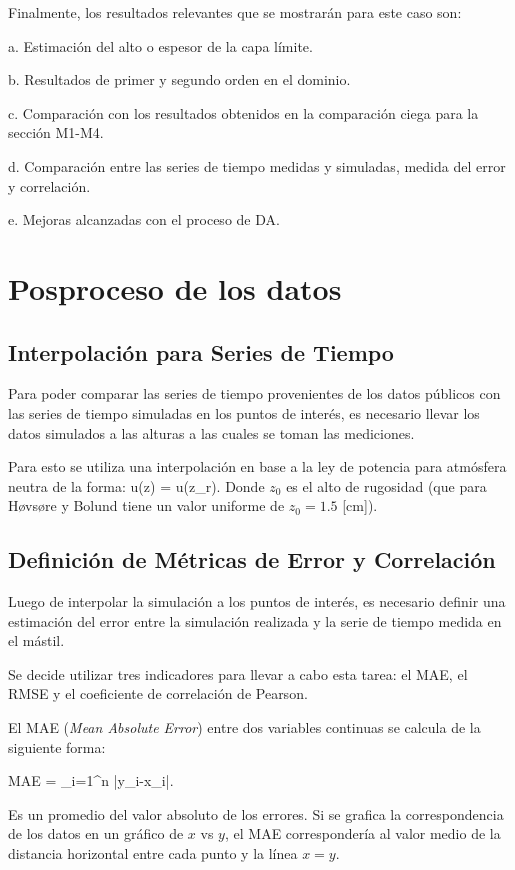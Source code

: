 Finalmente, los resultados relevantes que se mostrarán para este caso son:
\begin{enumerate*}
	\item[a.] Estimación del alto o espesor de la capa límite.
	\item[b.] Resultados de primer y segundo orden en el dominio.
	\item[c.] Comparación con los resultados obtenidos en la comparación ciega para la sección M1-M4.
	\item[d.] Comparación entre las series de tiempo medidas y simuladas, medida del error y correlación.
	\item[e.] Mejoras alcanzadas con el proceso de DA. 
\end{enumerate*}
\newpage
\section{Posproceso de los datos}
\subsection{Interpolación para Series de Tiempo}
Para poder comparar las series de tiempo provenientes de los datos públicos con las series de tiempo simuladas en los puntos de interés, es necesario llevar los datos simulados a las alturas a las cuales se toman las mediciones.

Para esto se utiliza una interpolación en base a la ley de potencia para atmósfera neutra de la forma:
\be 
u(z) = u(z_r).
\ee
Donde $z_0$ es el alto de rugosidad (que para Høvsøre y Bolund tiene un valor uniforme de $z_0=1.5$ [cm]).
\subsection{Definición de Métricas de Error y Correlación}
Luego de interpolar la simulación a los puntos de interés, es necesario definir una estimación del error entre la simulación realizada y la serie de tiempo medida en el mástil.

Se decide utilizar tres indicadores para llevar a cabo esta tarea: el MAE, el RMSE y el coeficiente de correlación de Pearson.

El MAE (\emph{Mean Absolute Error}) entre dos variables continuas se calcula de la siguiente forma:

\be 
MAE = \sum_{i=1}^n |y_i-x_i|.
\ee

Es un promedio del valor absoluto de los errores. Si se grafica la correspondencia de los datos en un gráfico de $x$ vs $y$, el MAE correspondería al valor medio de la distancia horizontal entre cada punto y la línea $x=y$.

